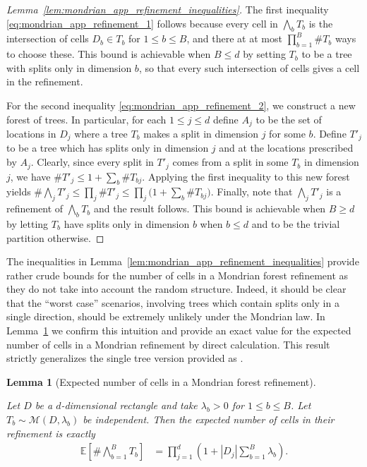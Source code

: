 \documentclass[11pt,lof]{puthesis}
\newcommand{\E}{\ensuremath{\mathbb{E}}}
\newcommand{\cM}{\ensuremath{\mathcal{M}}}
\theoremstyle{break}
\newtheorem{lemma}{Lemma}[section]
\theoremstyle{proof}
\newtheorem{proof}{Proof}
\begin{document}
\begin{proof}[Lemma~\ref{lem:mondrian_app_refinement_inequalities}]

The first inequality \eqref{eq:mondrian_app_refinement_1}
follows because every cell in
$\bigwedge_b T_b$ is the intersection of cells
$D_b \in T_b$ for $1 \leq b \leq B$, and there at at most
$\prod_{b=1}^{B} \# T_b$ ways to choose these.
This bound is achievable when $B \leq d$ by setting
$T_b$ to be a tree with splits only in dimension $b$,
so that every such intersection of cells
gives a cell in the refinement.

For the second inequality \eqref{eq:mondrian_app_refinement_2},
we construct a new forest of trees.
In particular, for each $1 \leq j \leq d$ define
$A_j$ to be the set of locations in $D_j$ where a tree $T_b$
makes a split in dimension $j$ for some $b$.
Define $T'_j$ to be a tree which has splits
only in dimension $j$ and at the locations prescribed by $A_j$.
Clearly, since every split in $T'_j$
comes from a split in some $T_b$ in dimension $j$,
we have $\# T'_j \leq 1 + \sum_b \# T_{b j}$.
Applying the first inequality to this new forest yields
$\# \bigwedge_j T'_j \leq \prod_j \# T'_j
\leq \prod_j \big( 1 + \sum_b \# T_{b j} \big)$.
Finally, note that $\bigwedge_j T'_j$
is a refinement of $\bigwedge_b T_b$ and the result follows.
This bound is achievable when $B \geq d$ by letting
$T_b$ have splits only in dimension $b$ when $b \leq d$
and to be the trivial partition otherwise.
%
\end{proof}

The inequalities in Lemma~\ref{lem:mondrian_app_refinement_inequalities} provide
rather crude bounds for the number of cells in a Mondrian forest
refinement as they do not take into account the random structure.
Indeed, it should be clear that the ``worst case'' scenarios, involving
trees which contain splits only in a single direction, should be extremely
unlikely under the Mondrian law. In Lemma~\ref{lem:mondrian_app_refinement} we
confirm
this intuition and provide an exact value for the expected number of cells
in a Mondrian refinement by direct calculation. This result strictly generalizes
the single tree version provided as \citet[Proposition~2]{mourtada2020minimax}.

\begin{lemma}[Expected number of cells in a Mondrian forest refinement]
\label{lem:mondrian_app_refinement}

Let $D$ be a $d$-dimensional rectangle
and take $\lambda_b > 0$ for $1 \leq b \leq B$.
Let $T_b \sim \cM(D, \lambda_b)$ be independent.
Then the expected number of cells in their refinement is exactly
%
\begin{align*}
\E\left[\# \bigwedge_{b=1}^B T_b \right]
&= \prod_{j=1}^d \left(
1 + |D_j| \sum_{b=1}^B \lambda_b
\right).
\end{align*}
%
\end{lemma}
\end{document}
